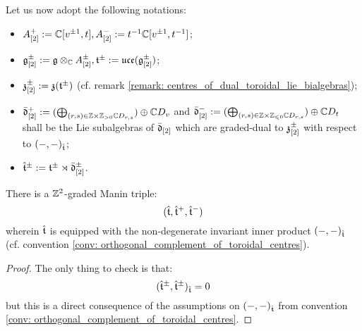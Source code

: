             \begin{convention}
                Let us now adopt the following notations:
                    \begin{itemize}
                        \item $A_{[2]}^+ := \mathbb{C}[v^{\pm 1}, t], A_{[2]}^- := t^{-1}\mathbb{C}[v^{\pm 1}, t^{-1}]$;
                        \item $\g_{[2]}^{\pm} := \g \tensor_{\bbC} A_{[2]}^{\pm}, \t^{\pm} := \uce(\g_{[2]}^{\pm})$;
                        \item $\mathfrak{z}_{[2]}^{\pm} := \mathfrak{z}(\mathfrak{t}^{\pm})$ (cf. remark \ref{remark: centres_of_dual_toroidal_lie_bialgebras});
                        \item $\bar{\d}_{[2]}^+ := ( \bigoplus_{(r, s) \in \Z \x \Z_{> 0} \bbC D_{r, s}} ) \oplus \bbC D_v$ and $\bar{\d}_{[2]}^- := ( \bigoplus_{(r, s) \in \Z \x \Z_{\leq 0} \bbC D_{r, s}} ) \oplus \bbC D_t$ shall be the Lie subalgebras of $\bar{\mathfrak{d}}_{[2]}$ which are graded-dual to $\mathfrak{z}_{[2]}^{\pm}$ with respect to $(-, -)_{\hat{\mathfrak{t}}}$;
                        \item $\hat{\mathfrak{t}}^{\pm} := \mathfrak{t}^{\pm} \rtimes \bar{\mathfrak{d}}_{[2]}^{\pm}$. 
                    \end{itemize}
            \end{convention}    
            \begin{theorem} \label{theorem: extended_toroidal_manin_triples}
                There is a $\mathbb{Z}^2$-graded Manin triple:
                    $$(\hat{\mathfrak{t}}, \hat{\mathfrak{t}}^+, \hat{\mathfrak{t}}^-)$$
                wherein $\hat{\mathfrak{t}}$ is equipped with the non-degenerate invariant inner product $(-, -)_{\hat{\mathfrak{t}}}$ (cf. convention \ref{conv: orthogonal_complement_of_toroidal_centres}).
            \end{theorem}
                \begin{proof}
                    The only thing to check is that:
                        $$(\hat{\mathfrak{t}}^{\pm}, \hat{\mathfrak{t}}^{\pm})_{\hat{\mathfrak{t}}} = 0$$
                    but this is a direct consequence of the assumptions on $(-, -)_{\hat{\mathfrak{t}}}$ from convention \ref{conv: orthogonal_complement_of_toroidal_centres}. 
                \end{proof}
            
    \printbibliography


